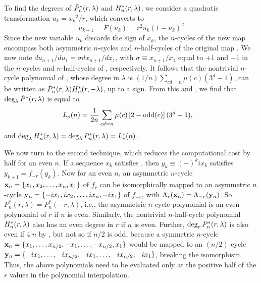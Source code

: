\documentclass{ws-ijbc}
\begin{document}
To find the degrees of $\tilde P^*_n(r, \lambda)$ and $H^*_n(r, \lambda)$,
  we consider a quadratic transformation $u_k = {x_k}^2/r$,
  which converts  to
\begin{equation}
  u_{k+1} = F(u_k) = r^2 u_k (1 - u_k)^2
\label{eq:uk}
\end{equation}
%
Since the new variable $u_k$ discards the sign of $x_k$,
  the $n$-cycles of the new map  encompass
  both
  asymmetric $n$-cycles
  and
  $n$-half-cycles
  of the original map .
%
We now note $d u_{n+1} / d u_1 = \sigma d x_{n+1} / d x_1$,
  with $\sigma \equiv x_{n+1}/x_1$ equal to $+1$ and $-1$
  in the $n$-cycles
  and
  $n$-half-cycles of , respectively.
%
It follows that the nontrivial
  $n$-cycle polynomial of ,
  whose degree in $\lambda$ is $(1/n)\sum_{cd = n} \mu(c) (3^d - 1)$,
  can be written as
  $\tilde P^*_n(r, \lambda) H^*_n(r, -\lambda)$,
  up to a sign.
%
From this and , we find that
  $\deg_\lambda \tilde P^*(r, \lambda)$ is equal to
%
\begin{align*}
  L_o(n) &= %
      \frac{1}{2n} \sum_{cd = n}
    \mu(c) \left[2 - \odd(c)\right] (3^d-1),
\end{align*}
and $\deg_\lambda H^*_n(r, \lambda) = \deg_\lambda P^*_n(r, \lambda) = L^*_e(n)$.
%



We now turn to the second technique,
  which reduces the computational cost
  by half for an even $n$.
%
If a sequence $x_k$ satisfies ,
  then $y_k \equiv (-)^k i x_k$
  satisfies $y_{k+1} = f_{-r}(y_k)$.
%
Now for an even $n$,
  an asymmetric $n$-cycle
  $\mathbf{x}_{n} = \{x_1, x_2, \dots, x_n, x_1\}$
  of $f_r$
  can be isomorphically mapped to
  an asymmetric $n$-cycle
  $\mathbf{y}_{n} = \{-i x_1, i x_2, \dots, i x_n, - i x_1\}$
  of $f_{-r}$,
  with $\Lambda_r(\mathbf{x}_{n}) = \Lambda_{-r}(\mathbf{y}_{n})$.
%
So $P^*_n(r, \lambda) = P^*_n(-r, \lambda)$,
  i.e., the asymmetric $n$-cycle polynomial is an even polynomial of $r$
  if $n$ is even.
%
Similarly, the nontrivial $n$-half-cycle polynomial $H^*_n(r, \lambda)$
  also has an even degree in $r$ if $n$ is even.
%
Further, $\deg_r P^*_{n}(r, \lambda)$ is also even if $4|n$
  by ,
  but not so if $n/2$ is odd,
  because a symmetric $n$-cycle %
  $\mathbf{x}_{n} = \{x_1, \dots, x_{n/2}, -x_1, \dots, -x_{n/2}, x_1\}$
  would be mapped to an $(n/2)$-cycle
  $\mathbf{y}_{n} = \{-i x_1, \dots, - i x_{n/2}, -i x_1, \dots, -i x_{n/2}, -i x_1\}$,
  breaking the isomorphism.
%
Thus, the above polynomials need to be evaluated only
  at the positive half of the $r$ values
  in the polynomial interpolation.
%
\end{document}
